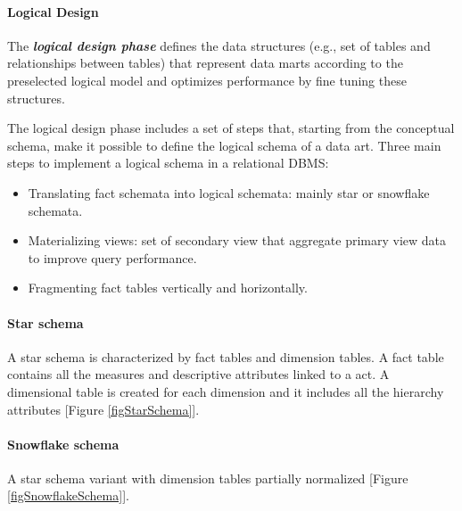 \paragraph{Logical Design}
The \textit{\textbf{logical design phase}} defines the data structures (e.g., set of tables and relationships between tables) that represent data marts according to the preselected logical model and optimizes performance by fine tuning these structures.

The logical design phase includes a set of steps that, starting from the conceptual schema, make it
possible to define the logical schema of a data art. Three main steps to implement a logical schema in a relational DBMS:
\begin{itemize}
    \item Translating fact schemata into logical schemata: mainly star or snowflake schemata.
    \item Materializing views: set of secondary view that aggregate primary view data to improve query performance.
    \item Fragmenting fact tables vertically and horizontally.
\end{itemize}

\paragraph{Star schema}
A star schema is characterized by fact tables and dimension tables. A fact table contains all the measures and descriptive attributes linked to a act. A dimensional table is created for each dimension and it includes all the hierarchy attributes [Figure \ref{figStarSchema}].

\paragraph{Snowflake schema}
A star schema variant with dimension tables partially normalized [Figure \ref{figSnowflakeSchema}].
\newpage

